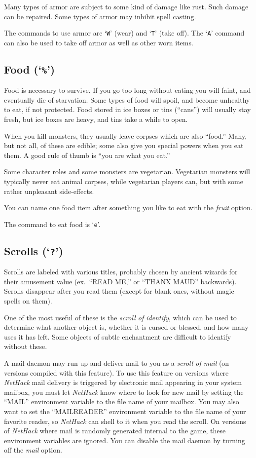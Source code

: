 Many types of armor are subject to some kind of damage like rust.  Such
damage can be repaired.  Some types of armor may inhibit spell casting.

The commands to use armor are `{\tt W}' (wear) and `{\tt T}' (take off).
The `{\tt A}' command can also be used to take off armor as well as other
worn items.

\subsection*{Food (`{\tt \%}')}

Food is necessary to survive.  If you go too long without eating you
will faint, and eventually die of starvation.
Some types of food will spoil, and become unhealthy to eat,
if not protected.
Food stored in ice boxes or tins (``cans'')
will usually stay fresh, but ice boxes are heavy, and tins
take a while to open.

When you kill monsters, they usually leave corpses which are also
``food.''  Many, but not all, of these are edible; some also give you
special powers when you eat them.  A good rule of thumb is ``you are
what you eat.''

Some character roles and some monsters are vegetarian.  Vegetarian monsters
will typically never eat animal corpses, while vegetarian players can,
but with some rather unpleasant side-effects.

You can name one food item after something you like to eat with the
{\it fruit\/} option.

The command to eat food is `{\tt e}'.

\subsection*{Scrolls (`{\tt ?}')}

Scrolls are labeled with various titles, probably chosen by ancient wizards
for their amusement value (ex.\ ``READ ME,'' or ``THANX MAUD'' backwards).
Scrolls disappear after you read them (except for blank ones, without
magic spells on them).

One of the most useful of these is the %
{\it scroll of identify}, which
can be used to determine what another object is, whether it is cursed or
blessed, and how many uses it has left.  Some objects of subtle
enchantment are difficult to identify without these.

A mail daemon may run up and deliver mail to you as a %
{\it scroll of mail} (on versions compiled with this feature).
To use this feature on versions where {\it NetHack\/}
mail delivery is triggered by electronic mail appearing in your system mailbox,
you must let {\it NetHack\/} know where to look for new mail by setting the
``MAIL'' environment variable to the file name of your mailbox.
You may also want to set the ``MAILREADER'' environment variable to the
file name of your favorite reader, so {\it NetHack\/} can shell to it when you
read the scroll.
On versions of {\it NetHack\/} where mail is randomly
generated internal to the game, these environment variables are ignored.
You can disable the mail daemon by turning off the
{\it mail\/} option.

